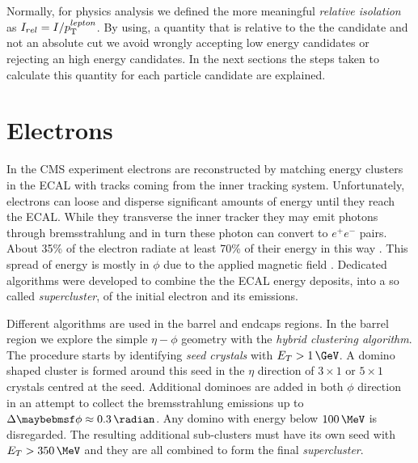 Normally, for physics analysis we defined the more meaningful \textit{relative isolation} as $I_{rel} = I/p_{\mathrm{T}}^{lepton}$. By using, a quantity that is relative to the the candidate \pt and not an absolute cut we avoid wrongly accepting low energy candidates or rejecting an high energy candidates. In the next sections the steps taken to calculate this quantity for each particle candidate are explained.

\section{Electrons}
\label{SECTION:EventReconstructionAndSimulation_Electrons}


In the \gls{CMS} experiment electrons are reconstructed by matching energy clusters in the \gls{ECAL} with tracks coming from the inner tracking system. Unfortunately, electrons can loose and disperse significant amounts of energy until they reach the \gls{ECAL}. While they transverse the inner tracker they may emit photons through bremsstrahlung and in turn these photon can convert to $e^+e^-$ pairs. About 35\% of the electron radiate at least 70\% of their energy in this way \cite{ARTICLE:CMSElectronReconstruction}. This spread of energy is mostly in $\phi$ due to the applied magnetic field \cite{ARTICLE:CMSElectronReconstructionECAL}. Dedicated algorithms were developed to combine the the \gls{ECAL} energy deposits, into a so called \textit{supercluster}, of the initial electron and its emissions.

Different algorithms are used in the barrel and endcaps regions. In the barrel region we explore the simple $\eta-\phi$ geometry with the \textit{hybrid clustering algorithm}. The procedure starts by identifying \textit{seed crystals} with $E_T>1\,\GeV$. A domino shaped cluster is formed around this seed in the $\eta$ direction of $3 \times 1$ or $5 \times 1$ crystals centred at the seed. Additional dominoes are added in both $\phi$ direction in an attempt to collect the bremsstrahlung emissions up to $\Delta\phi \approx 0.3\,\radian$. Any domino with energy below $100\,\MeV$ is disregarded. The resulting additional sub-clusters must have its own seed with $E_T>350\,\MeV$ and they are all combined to form the final \textit{supercluster}. 

